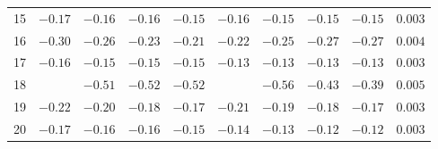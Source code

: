 \begin{tabular}{@{}l cccc cccc r@{}}
15 & $-0.17$ & $-0.16$ & $-0.16$ & $-0.15$ & $-0.16$ & $-0.15$ & $-0.15$ & $-0.15$ & $0.003$ \\
16 & $-0.30$ & $-0.26$ & $-0.23$ & $-0.21$ & $-0.22$ & $-0.25$ & $-0.27$ & $-0.27$ & $0.004$ \\
17 & $-0.16$ & $-0.15$ & $-0.15$ & $-0.15$ & $-0.13$ & $-0.13$ & $-0.13$ & $-0.13$ & $0.003$ \\
\cmidrule{1-10}
18 &         & $-0.51$ & $-0.52$ & $-0.52$ &         & $-0.56$ & $-0.43$ & $-0.39$ & $0.005$ \\
19 & $-0.22$ & $-0.20$ & $-0.18$ & $-0.17$ & $-0.21$ & $-0.19$ & $-0.18$ & $-0.17$ & $0.003$ \\
20 & $-0.17$ & $-0.16$ & $-0.16$ & $-0.15$ & $-0.14$ & $-0.13$ & $-0.12$ & $-0.12$ & $0.003$ \\
\bottomrule
\end{tabular}

